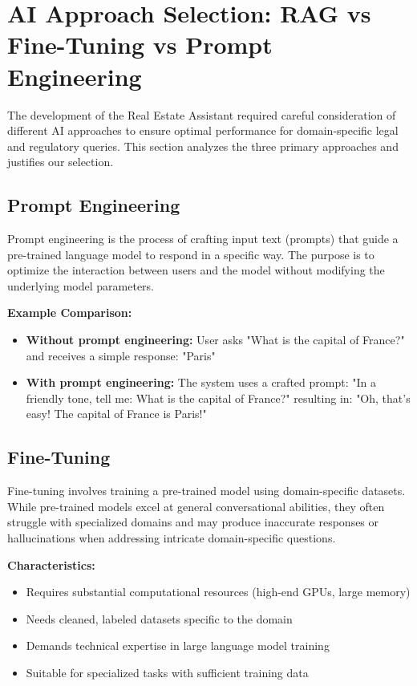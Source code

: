 \chapter*{AI Approach Selection: RAG vs Fine-Tuning vs Prompt Engineering}
\label{app:E}

The development of the Real Estate Assistant required careful consideration of different AI approaches to ensure optimal performance for domain-specific legal and regulatory queries. This section analyzes the three primary approaches and justifies our selection.

\section*{Prompt Engineering}

Prompt engineering is the process of crafting input text (prompts) that guide a pre-trained language model to respond in a specific way. The purpose is to optimize the interaction between users and the model without modifying the underlying model parameters.

\textbf{Example Comparison:}
\begin{itemize}
    \item \textbf{Without prompt engineering:} User asks "What is the capital of France?" and receives a simple response: "Paris"
    \item \textbf{With prompt engineering:} The system uses a crafted prompt: "In a friendly tone, tell me: What is the capital of France?" resulting in: "Oh, that's easy! The capital of France is Paris!"
\end{itemize}

\section*{Fine-Tuning}

Fine-tuning involves training a pre-trained model using domain-specific datasets. While pre-trained models excel at general conversational abilities, they often struggle with specialized domains and may produce inaccurate responses or hallucinations when addressing intricate domain-specific questions.

\textbf{Characteristics:}
\begin{itemize}
    \item Requires substantial computational resources (high-end GPUs, large memory)
    \item Needs cleaned, labeled datasets specific to the domain
    \item Demands technical expertise in large language model training
    \item Suitable for specialized tasks with sufficient training data
\end{itemize}

